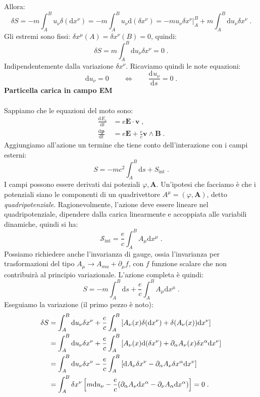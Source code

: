 \documentclass[12pt,a4paper]{report}
\theoremstyle{definition}
\newcommand{\dev}[3][]{\frac{\mathrm{d}^{#1} #2}{\mathrm{d} #3^{#1}}}
\newcommand{\diff}[1][]{\mathrm{d}#1}
\begin{document}
Allora:
\begin{equation*}
\delta S=-m\int_A^B u_{\nu}\delta(\diff{x^{\nu}})=-m\int_A^B u_{\nu}\diff{(\delta x^{\nu})}= \left. -mu_{\nu}\delta x^{\nu}\right|_A^B+m\int_A^B\diff{u_{\nu}}\delta x^{\nu}\;.
\end{equation*}
Gli estremi sono fissi: $\delta x^{\mu}(A)=\delta x^{\nu}(B)=0$, quindi:
\begin{equation}
\delta S=m\int_A^B\diff{u_{\nu}}\delta x^{\nu}=0\;.
\end{equation}
Indipendentemente dalla variazione $\delta x^{\nu}$. Ricaviamo quindi le note equazioni:
\begin{equation}
\diff{u_{\nu}}=0 \qquad \Longleftrightarrow \qquad \dev{u_{\nu}}{s}=0\;.
\end{equation}
\textbf{Particella carica in campo EM} \\
\\
Sappiamo che le equazioni del moto sono:
\begin{align*}
\dev{E_c}{t} &= e\mathbf{E}\cdot\mathbf{v}\;, \\
\dev{\mathbf{p}}{t} &= e\mathbf{E}+\frac{e}{c}\mathbf{v}\wedge\mathbf{B}\;.
\end{align*}
Aggiungiamo all'azione un termine che tiene conto dell'interazione con i campi esterni:
$$
S=-mc^2\int_A^B\diff{s}+S_{\mathrm{int}}\;.
$$
I campi possono essere derivati dai poteziali $\varphi,\mathbf{A}$. Un'ipotesi che facciamo è che i potenziali siano le componenti di un quadrivettore $A^{\mu}=(\varphi,\mathbf{A})$, detto \emph{quadripotenziale}. Ragionevolmente, l'azione deve essere lineare nel quadripotenziale, dipendere dalla carica linearmente e accoppiata alle variabili dinamiche, quindi si ha:
\begin{equation}
\mathcal{S}_{\mathrm{int}}=\frac{e}{c}\int_A^B A_{\mu}\diff{x^{\mu}}\;.
\end{equation}
Possiamo richiedere anche l'invarianza di gauge, ossia l'invarianza per trasformazioni del tipo $A_{\mu}\longrightarrow A_{mu}+\partial_{\mu}f$, con $f$ funzione scalare che non contribuirà al principio variazionale. L'azione completa è quindi:
$$
S=-m\int_A^B\diff{s}+\frac{e}{c}\int_A^B A_{\mu}\diff{x^{\mu}}\;.
$$
Eseguiamo la variazione (il primo pezzo è noto):
\begin{align}
\delta S &= \int_A^B\diff{u_{\nu}}\delta x^{\nu}+\frac{e}{c}\int_A^B\left[A_{\nu}(x)\delta(\diff{x^{\nu}})+\delta(A_{\nu}(x))\diff{x^{\nu}}\right]  \notag \\
&= \int_A^B\diff{u_{\nu}}\delta x^{\nu}+\frac{e}{c}\int_A^B\left[A_{\nu}(x)\diff{(\delta x^{\nu})}+\partial_{\alpha}A_{\nu}(x)\delta x^{\alpha}\diff{x^{\nu}}\right] \notag \\
&= \int_A^B\diff{u_{\nu}}\delta x^{\nu}-\frac{e}{c}\int_A^B\left[\diff{A_{\nu}}\delta x^{\nu}-\partial_{\alpha}A_{\nu}\delta x^{\alpha}\diff{x^{\nu}}\right]  \notag \\
&= \int_A^B \delta x^{\nu}\left[m\diff{u_{\nu}}-\frac{e}{c}(\partial_{\alpha}A_{\nu}\diff{x^{\alpha}}-\partial_{\nu}A_{\alpha}\diff{x^{\alpha}})\right]=0\;.
\end{align}
\end{document}
